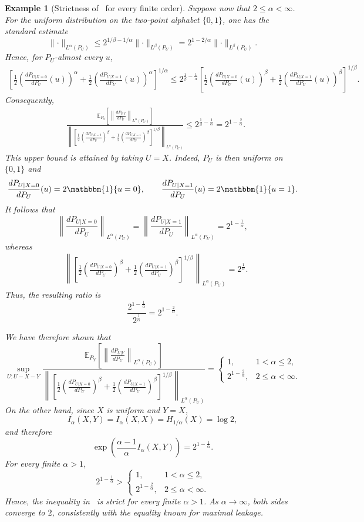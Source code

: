 \documentclass{article}
\numberwithin{theorem}{section}
\newtheorem{example}{Example}
\numberwithin{example}{section}
\numberwithin{remark}{section}
\numberwithin{definition}{section}
\begin{document}
\begin{example}[Strictness of~ for every finite order]
Suppose now that $2\leq\alpha<\infty$. For the uniform distribution on the two-point alphabet $\{0,1\}$, one has the standard estimate 
$$
\lVert\cdot\rVert_{L^\alpha(P_U)}
\leq
2^{1/\beta-1/\alpha}
\lVert\cdot\rVert_{L^\beta(P_U)}
=
2^{1-2/\alpha}
\lVert\cdot\rVert_{L^\beta(P_U)}.
$$
Hence, for $P_U$-almost every $u$,
\begin{align}
\left[
\frac12
\left(\frac{dP_{U|X=0}}{dP_U}(u)\right)^\alpha
+
\frac12
\left(\frac{dP_{U|X=1}}{dP_U}(u)\right)^\alpha
\right]^{1/\alpha}
\nonumber\leq
2^{\frac1\beta-\frac1\alpha}
\left[
\frac12
\left(\frac{dP_{U|X=0}}{dP_U}(u)\right)^\beta
+
\frac12
\left(\frac{dP_{U|X=1}}{dP_U}(u)\right)^\beta
\right]^{1/\beta}.
\end{align}
Consequently,
\begin{align}
&\frac{
\mathbb{E}_{P_Y}\left[
\left\|
\frac{dP_{U|Y}}{dP_U}
\right\|_{L^\alpha(P_U)}
\right]
}{
\left\|
\left[
\frac12
\left(\frac{dP_{U|X=0}}{dP_U}\right)^\beta
+
\frac12
\left(\frac{dP_{U|X=1}}{dP_U}\right)^\beta
\right]^{1/\beta}
\right\|_{L^\alpha(P_U)}
}
\leq
2^{\frac1\beta-\frac1\alpha}
=
2^{1-\frac{2}{\alpha}}.
\end{align}
This upper bound is attained by taking $U=X$. Indeed, $P_U$ is then uniform on $\{0,1\}$ and
\[
\frac{dP_{U|X=0}}{dP_U}(u)
=
2\mathbbm{1}\{u=0\},
\qquad
\frac{dP_{U|X=1}}{dP_U}(u)
=
2\mathbbm{1}\{u=1\}.
\]
It follows that
\[
\left\|
\frac{dP_{U|X=0}}{dP_U}
\right\|_{L^\alpha(P_U)}
=
\left\|
\frac{dP_{U|X=1}}{dP_U}
\right\|_{L^\alpha(P_U)}
=
2^{1-\frac1\alpha},
\]
whereas
\begin{align}
&\left\|
\left[
\frac12
\left(\frac{dP_{U|X=0}}{dP_U}\right)^\beta
+
\frac12
\left(\frac{dP_{U|X=1}}{dP_U}\right)^\beta
\right]^{1/\beta}
\right\|_{L^\alpha(P_U)}
=
2^{\frac1\alpha}.
\end{align}
Thus, the resulting ratio is
\[
\frac{2^{1-\frac1\alpha}}{2^{\frac1\alpha}}
=
2^{1-\frac{2}{\alpha}}.
\]

We have therefore shown that
\[
\sup_{U:U-X-Y}
\frac{
\mathbb{E}_{P_Y}\left[
\left\|
\frac{dP_{U|Y}}{dP_U}
\right\|_{L^\alpha(P_U)}
\right]
}{
\left\|
\left[
\frac12
\left(\frac{dP_{U|X=0}}{dP_U}\right)^\beta
+
\frac12
\left(\frac{dP_{U|X=1}}{dP_U}\right)^\beta
\right]^{1/\beta}
\right\|_{L^\alpha(P_U)}
}
=
\begin{cases}
1, & 1<\alpha\leq2,\\[1mm]
2^{1-\frac{2}{\alpha}}, & 2\leq\alpha<\infty.
\end{cases}
\]
On the other hand, since $X$ is uniform and $Y=X$,
\[
I_\alpha(X,Y)
=
I_\alpha(X,X)
=
H_{1/\alpha}(X)
=
\log2,
\]
and therefore
\[
\exp\left(
\frac{\alpha-1}{\alpha}I_\alpha(X,Y)
\right)
=
2^{1-\frac1\alpha}.
\]
For every finite $\alpha>1$,
\[
2^{1-\frac1\alpha}
>
\begin{cases}
1, & 1<\alpha\leq2,\\[1mm]
2^{1-\frac{2}{\alpha}}, & 2\leq\alpha<\infty.
\end{cases}
\]
Hence, the inequality in~ is strict for every finite $\alpha>1$. As $\alpha\to\infty$, both sides converge to $2$, consistently with the equality known for maximal leakage.
\end{example} \iffalse 
\end{document}
